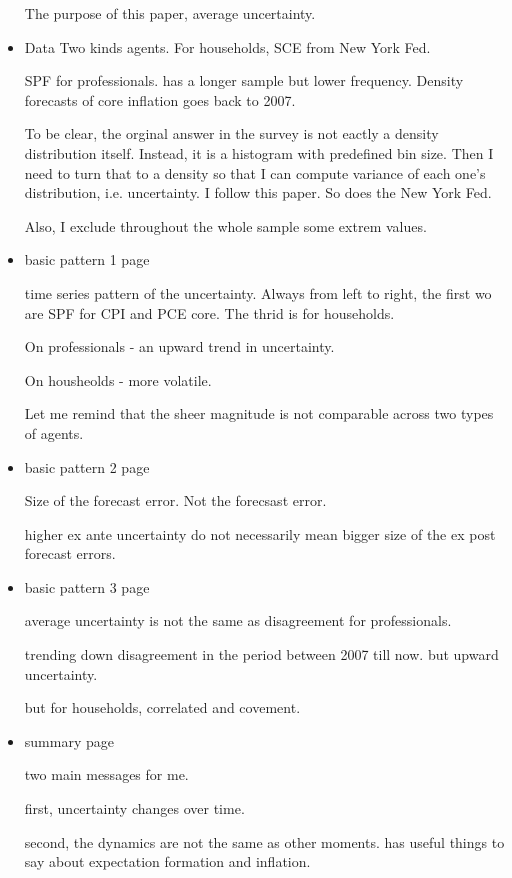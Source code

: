 \documentclass[]{article}
\begin{document}
\begin{itemize}
The purpose of this paper, average uncertainty.
 
 
 \item Data  
 Two kinds agents. For households, SCE from New York Fed. 
 
 SPF for professionals. has a longer sample but lower frequency. Density forecasts of core inflation goes back to 2007.
 
 To be clear, the orginal answer in the survey is not eactly a density distribution itself. Instead, it is a histogram with predefined bin size.  Then I need to turn that to a density so that I can compute variance of each one's distribution, i.e. uncertainty.  I follow this paper. So does the New York Fed. 
 
 Also, I exclude throughout the whole sample some extrem values. 
  
\item basic pattern 1 page

time series pattern of the uncertainty. 
Always from left to right, the first wo are SPF for CPI and PCE core. The thrid is for households. 

On professionals
- an upward trend in uncertainty. 

On housheolds
- more volatile. 

Let me remind that the sheer magnitude is not comparable across two types of agents.  

\item basic pattern 2 page

Size of the forecast error. Not the forecsast error. 

higher ex ante uncertainty do not necessarily mean bigger size of the ex post  forecast errors. 

\item basic pattern 3 page

average uncertainty is not the same as disagreement for professionals.  

trending down disagreement in the period between 2007 till now. but upward uncertainty. 

but for households, correlated and covement. 

\item summary page

two main messages for me. 

first, uncertainty changes over time. 

second, the dynamics are not the same as other moments. has useful things to say about expectation formation and inflation. 


\end{itemize}
\end{document}
